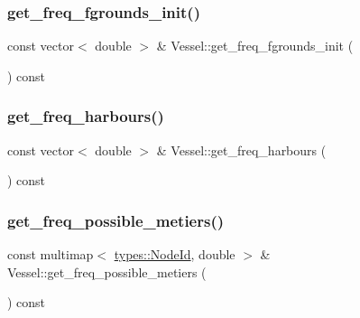 \mbox{\label{class_vessel_a48ccc2504eb09db5b055a463af81978a}} 
\subsubsection{\texorpdfstring{get\_freq\_fgrounds\_init()}{get\_freq\_fgrounds\_init()}}
{\footnotesize\ttfamily const vector$<$ double $>$ \& Vessel\+::get\+\_\+freq\+\_\+fgrounds\+\_\+init (\begin{DoxyParamCaption}{ }\end{DoxyParamCaption}) const}

\mbox{\label{class_vessel_a51e1eda9553394c462db8c5c3e6cd53a}} 
\subsubsection{\texorpdfstring{get\_freq\_harbours()}{get\_freq\_harbours()}}
{\footnotesize\ttfamily const vector$<$ double $>$ \& Vessel\+::get\+\_\+freq\+\_\+harbours (\begin{DoxyParamCaption}{ }\end{DoxyParamCaption}) const}

\mbox{\label{class_vessel_a04b83746d403ca9f0a029343a39112be}} 
\subsubsection{\texorpdfstring{get\_freq\_possible\_metiers()}{get\_freq\_possible\_metiers()}}
{\footnotesize\ttfamily const multimap$<$ \mbox{\hyperlink{classtypes_1_1_node_id}{types\+::\+Node\+Id}}, double $>$ \& Vessel\+::get\+\_\+freq\+\_\+possible\+\_\+metiers (\begin{DoxyParamCaption}{ }\end{DoxyParamCaption}) const}

\mbox{\label{class_vessel_ae7b858da326bd11b36578fbcb35c78de}} 
